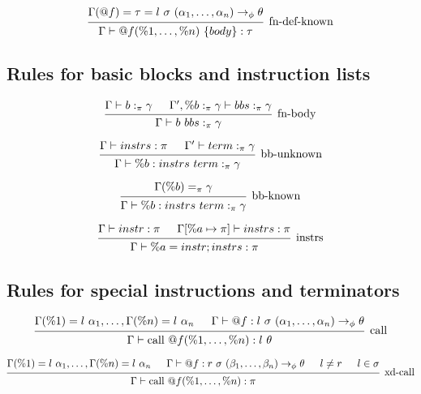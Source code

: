 \documentclass{article}
\begin{document}
\[
\begin{prooftree}
    \hypo{
    \Gamma(@f) = \tau = l\ \sigma\ (\alpha_1, \dots, \alpha_n) \rightarrow_\phi \theta
    }
    \infer1[fn-def-known]{\Gamma \vdash @f(\%1, \dots, \%n)\ \{ body \} : \tau}
\end{prooftree}
\]

\subsection{Rules for basic blocks and instruction lists}

\[
\begin{prooftree} 
    \hypo{\Gamma \vdash b :_\pi \gamma}
    \hypo{\Gamma', \%b :_\pi \gamma \vdash bbs :_\pi \gamma}
    \infer2[fn-body]{\Gamma \vdash b\ bbs :_\pi \gamma}
\end{prooftree} 
\]


\[
\begin{prooftree} 
    \hypo{\Gamma \vdash instrs : \pi}
    \hypo{\Gamma' \vdash term :_\pi \gamma}
    \infer2[bb-unknown]{\Gamma \vdash \%b: instrs\ term :_\pi \gamma}
\end{prooftree} 
\]


\[
\begin{prooftree} 
    \hypo{\Gamma(\%b) =_\pi \gamma} 
    \infer1[bb-known]{\Gamma \vdash \%b: instrs\ term :_\pi \gamma}
\end{prooftree} 
\]


\[
\begin{prooftree} 
    \hypo{\Gamma \vdash instr : \pi}
    \hypo{\Gamma[\%a \mapsto \pi] \vdash instrs : \pi}
    \infer2[instrs]{\Gamma \vdash \%a = instr; instrs : \pi}
\end{prooftree} 
\]

\subsection{Rules for special instructions and terminators}

\[
\begin{prooftree}
    \hypo{\Gamma(\%1) = l\ \alpha_1, \dots, \Gamma(\%n) = l\ \alpha_n}
    \hypo{\Gamma \vdash @f : l\ \sigma\ (\alpha_1, \dots, \alpha_n) \rightarrow_\phi \theta}
    \infer2[call]{\Gamma \vdash \text{call } @f(\%1, \dots, \%n) : l\ \theta}
\end{prooftree}
\]

\[
\begin{prooftree}
    \hypo{\Gamma(\%1) = l\ \alpha_1, \dots, \Gamma(\%n) = l\ \alpha_n}
    \hypo{\Gamma \vdash @f : r\ \sigma\ (\beta_1, \dots, \beta_n) \rightarrow_\phi \theta}
    \hypo{l \neq r}
    \hypo{l \in \sigma}
    \infer4[xd-call]{\Gamma \vdash \text{call } @f(\%1, \dots, \%n) : \pi}
\end{prooftree}
\]
\end{document}
